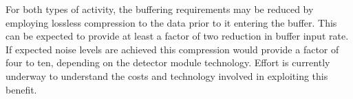 For both types of activity, the buffering requirements may be reduced by employing lossless compression to the data prior to it entering the buffer.
This can be expected to provide at least a factor of two reduction in buffer input rate. 
If expected noise levels are achieved this compression would provide a factor of four to ten, depending on the detector module technology.
Effort is currently underway to understand the costs and technology involved in exploiting this benefit.







